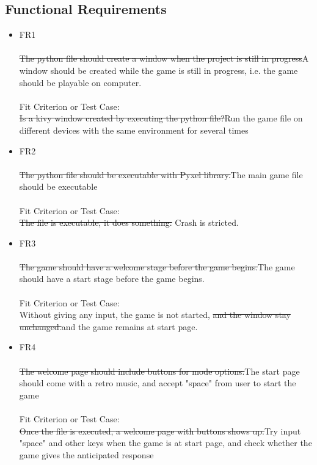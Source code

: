 \documentclass[12pt, titlepage]{article}
\begin{document}
\subsection{Functional Requirements}
\begin{itemize}
    \item FR1\\\\
     \sout{The python file should create a window when the project is still in progress}{\color{red}A window should be created while the game is still in progress}, i.e. the game should be playable on computer.\\\\
    Fit Criterion or Test Case:\\
    \sout{Is a kivy window created by executing the python file?}{\color{red}Run the game file on different devices with the same environment for several times}
    \item FR2\\\\
    \sout{The python file should be executable with Pyxel library.}{\color{red}The main game file should be executable}\\\\
    Fit Criterion or Test Case:\\
    \sout{The file is executable, it does something.} Crash is stricted.
    \item FR3\\\\
    \sout{The game should have a welcome stage before the game begins.}{\color{red}The game should have a start stage before the game begins.}\\\\
    Fit Criterion or Test Case:\\
    Without giving any input, the game is not started, \sout{and the window stay unchanged.}{\color{red}and the game remains at start page.}
    \item FR4\\\\
     \sout{The welcome page should include buttons for mode options.}{\color{red}The start page should come with a retro music, and accept "space" from user to start the game}\\\\
    Fit Criterion or Test Case:\\
    \sout{Once the file is executed, a welcome page with buttons shows up.}{\color{red}Try input "space" and other keys when the game is at start page, and check whether the game gives the anticipated response}

\end{itemize}
\end{document}
